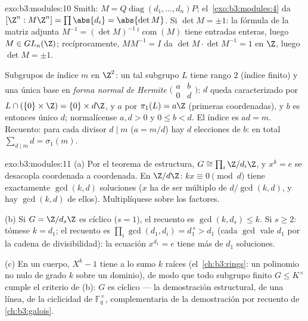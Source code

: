 \begin{solution}{exo:b3:modules:10}
Smith: $M = Q\operatorname{diag}(d_1,\dots,d_n)P$;
el~\cref{exo:b3:modules:4} da $[\Z^n : M\Z^n] = \prod\abs{d_i} =
\abs{\det M}$. Si $\det M = \pm 1$: la fórmula de la matriz adjunta
$M^{-1} = (\det M)^{-1}\,{}^{t}\!\operatorname{com}(M)$ tiene entradas
enteras, luego $M \in GL_n(\Z)$; recíprocamente, $MM^{-1} = I$ da
$\det M \cdot \det M^{-1} = 1$ en $\Z$, luego $\det M = \pm1$.

Subgrupos de índice $m$ en $\Z^2$: un tal subgrupo $L$ tiene rango $2$
(índice finito) y una única base en \emph{forma normal de Hermite}
$\bigl(\begin{smallmatrix} a & b\\ 0 &
d\end{smallmatrix}\bigr)$: $d$ queda caracterizado por $L \cap (\{0\}
\times \Z) = \{0\} \times d\Z$, y $a$ por $\pi_1(L) = a\Z$ (primeras
coordenadas), y $b$ es entonces único  $d$; normalícense $a, d
> 0$ y $0 \leq b < d$. El índice es $ad = m$. Recuento: para cada
divisor $d \mid m$ ($a = m/d$) hay $d$ elecciones de $b$: en total
$\sum_{d \mid m} d = \sigma_1(m)$.
\end{solution}

\begin{solution}{exo:b3:modules:11}
(a) Por el teorema de estructura, $G \cong \prod_i\Z/d_i\Z$, y $x^k = e$
se desacopla coordenada a coordenada. En $\Z/d\Z$: $kx \equiv 0
\pmod d$ tiene exactamente $\gcd(k, d)$ soluciones ($x$ ha de ser
múltiplo de $d/\gcd(k,d)$, y hay $\gcd(k, d)$ de ellos). Multiplíquese
sobre los factores.

(b) Si $G = \Z/d_s\Z$ es cíclico ($s = 1$), el recuento es
$\gcd(k, d_s) \leq k$. Si $s \geq 2$: tómese $k = d_1$; el recuento es
$\prod_i\gcd(d_1, d_i) = d_1^{\,s} > d_1$ (cada $\gcd$ vale $d_1$ por la
cadena de divisibilidad): la ecuación $x^{d_1} = e$ tiene más de $d_1$
soluciones.

(c) En un cuerpo, $X^k - 1$ tiene a lo sumo $k$ raíces
(el~\cref{ch:b3:rings}: un polinomio no nulo de grado $k$ sobre un
dominio), de modo que todo subgrupo finito $G \leq K^\times$ cumple el
criterio de (b): $G$ es cíclico --- la demostración estructural, de una
línea, de la ciclicidad de $\mathbb F_q^\times$, complementaria de la
demostración por recuento de
\cref{ch:b3:galois}.
\end{solution}

